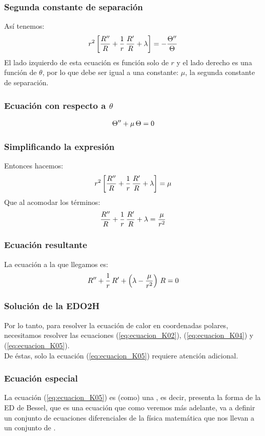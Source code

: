 \documentclass[12pt]{beamer}
\begin{document}
\begin{frame}
\frametitle{Segunda constante de separación}
Así tenemos:
\pause
\begin{align}
r^{2} \left[ \dfrac{{R}^{\prime \prime}}{R} + \dfrac{1}{r} \, \dfrac{{R}^{\prime}}{R} + \lambda \right] = - \dfrac{{\Theta}^{\prime \prime}}{\Theta}
\label{eq:ecuacion_K03}    
\end{align}
El lado izquierdo de esta ecuación es función solo de $r$ y el lado derecho es una función de $\theta$, por lo que debe ser igual a una constante: $\mu$, la segunda constante de separación.
\end{frame}
\begin{frame}
\frametitle{Ecuación con respecto a $\theta$}
\begin{align}
{\Theta}^{\prime \prime} + \mu \, \Theta = 0
\label{eq:ecuacion_K04}    
\end{align}
\end{frame}
\begin{frame}
\frametitle{Simplificando la expresión}
Entonces hacemos:
\pause
\begin{align*}
r^{2} \left[ \dfrac{{R}^{\prime \prime}}{R} + \dfrac{1}{r} \, \dfrac{{R}^{\prime}}{R} + \lambda \right] = \mu
\end{align*}
\pause
Que al acomodar los términos:
\pause
\begin{align*}
\dfrac{{R}^{\prime \prime}}{R} + \dfrac{1}{r} \, \dfrac{{R}^{\prime}}{R} + \lambda = \dfrac{\mu}{r^{2}}
\end{align*}
\end{frame}
\begin{frame}
\frametitle{Ecuación resultante}
La ecuación a la que llegamos es:
\pause
\begin{align}
{R}^{\prime \prime} + \dfrac{1}{r} \, {R}^{\prime} + \left( \lambda - \dfrac{\mu}{r^{2}} \right) \, R = 0
\label{eq:ecuacion_K05}    
\end{align}
\end{frame}
\begin{frame}
\frametitle{Solución de la EDO2H}
Por lo tanto, para resolver la ecuación de calor en coordenadas polares, necesitamos resolver las ecuaciones (\ref{eq:ecuacion_K02}), (\ref{eq:ecuacion_K04}) y (\ref{eq:ecuacion_K05}).
\\
\bigskip
\pause
De éstas, solo la ecuación (\ref{eq:ecuacion_K05}) requiere atención adicional.
\end{frame}
\begin{frame}
\frametitle{Ecuación especial}
La ecuación (\ref{eq:ecuacion_K05}) es (como) una , es decir, presenta la forma de la ED de Bessel, que es una ecuación que como veremos más adelante, \pause va a definir un conjunto de ecuaciones diferenciales de la física matemática que nos llevan a un conjunto de .
\end{frame}
\end{document}
